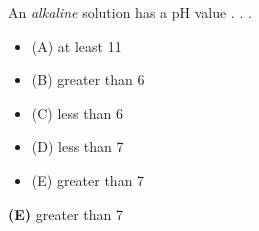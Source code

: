 

An {\it alkaline} solution has a pH value . . .

\begin{itemize}
\item{(A)} at least 11
\vskip 5pt 
\item{(B)} greater than 6
\vskip 5pt 
\item{(C)} less than 6
\vskip 5pt 
\item{(D)} less than 7
\vskip 5pt 
\item{(E)} greater than 7
\end{itemize}







{\bf (E)} greater than 7
 











